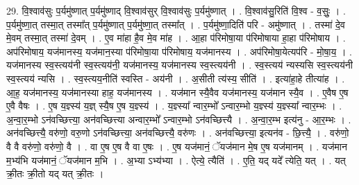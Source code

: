 \documentclass[17pt]{extarticle}
\begin{document}
29. वि॒श्वाव॑सुः प॒र्यमु॑ष्णात् प॒र्यमु॑ष्णाद् वि॒श्वाव॑सुर् वि॒श्वाव॑सुः प॒र्यमु॑ष्णात् । . वि॒श्वाव॑सु॒रिति॑ वि॒श्व - व॒सुः॒ । . प॒र्यमु॑ष्णा॒त् तस्मा॒त् तस्मा᳚त् प॒र्यमु॑ष्णात् प॒र्यमु॑ष्णा॒त् तस्मा᳚त् । . प॒र्यमु॑ष्णा॒दिति॑ परि - अमु॑ष्णात् । . तस्मा॑ दे॒व मे॒वम् तस्मा॒त् तस्मा॑ दे॒वम् । . ए॒व मा॑हा है॒व मे॒व मा॑ह । . आ॒हा प॑रिमोषा॒या प॑रिमोषाया हा॒हा प॑रिमोषाय । . अप॑रिमोषाय॒ यज॑मानस्य॒ यज॑मान॒स्या प॑रिमोषा॒या प॑रिमोषाय॒ यज॑मानस्य । . अप॑रिमोषा॒येत्यप॑रि - मो॒षा॒य॒ । . यज॑मानस्य स्व॒स्त्यय॑नी स्व॒स्त्यय॑नी॒ यज॑मानस्य॒ यज॑मानस्य स्व॒स्त्यय॑नी । . स्व॒स्त्यय॑ न्यस्यसि स्व॒स्त्यय॑नी स्व॒स्त्यय॑ न्यसि । . स्व॒स्त्यय॒नीति॑ स्वस्ति - अय॑नी । . अ॒सीती त्य॑स्य॒ सीति॑ । . इत्या॑हा॒हे तीत्या॑ह । . आ॒ह॒ यज॑मानस्य॒ यज॑मानस्या हाह॒ यज॑मानस्य । . यज॑मान स्यै॒वैव यज॑मानस्य॒ यज॑मान स्यै॒व । . ए॒वैष ए॒ष ए॒वै वैषः । . ए॒ष य॒ज्ञ्स्य॑ य॒ज्ञ् स्यै॒ष ए॒ष य॒ज्ञ्स्य॑ । . य॒ज्ञ्स्या᳚ न्वार॒म्भो᳚ ऽन्वार॒म्भो य॒ज्ञ्स्य॑ य॒ज्ञ्स्या᳚ न्वार॒म्भः । . अ॒न्वा॒र॒म्भो ऽन॑वच्छित्त्या॒ अन॑वच्छित्त्या अन्वार॒म्भो᳚ ऽन्वार॒म्भो ऽन॑वच्छित्त्यै । . अ॒न्वा॒र॒म्भ इत्य॑नु - आ॒र॒म्भः । . अन॑वच्छित्त्यै॒ वरु॑णो॒ वरु॒णो ऽन॑वच्छित्त्या॒ अन॑वच्छित्त्यै॒ वरु॑णः । . अन॑वच्छित्त्या॒ इत्यन॑व - छि॒त्त्यै॒ । . वरु॑णो॒ वै वै वरु॑णो॒ वरु॑णो॒ वै । . वा ए॒ष ए॒ष वै वा ए॒षः । . ए॒ष यज॑मानं॒ ॅयज॑मान मे॒ष ए॒ष यज॑मानम् । . यज॑मान म॒भ्य॑भि यज॑मानं॒ ॅयज॑मान म॒भि । . अ॒भ्या ऽभ्य॑भ्या । . ऐत्ये॒ त्यैति॑ । . ए॒ति॒ यद् यदे᳚ त्येति॒ यत् । . यत् क्री॒तः क्री॒तो यद् यत् क्री॒तः । \newline
\end{document}
